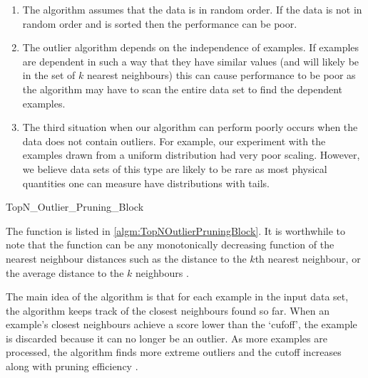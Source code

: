 \begin{enumerate}
    \item The algorithm assumes that the data is in random order. If the data is
        not in random order and is sorted then the performance can be poor.
    \item The outlier algorithm depends on the independence of examples. If
        examples are dependent in such a way that they have similar values (and
        will likely be in the set of $k$ nearest neighbours) this can cause
        performance to be poor as the algorithm may have to scan the entire data
        set to find the dependent examples.
    \item The third situation when our algorithm can perform poorly occurs when
        the data does not contain outliers. For example, our experiment with the
        examples drawn from a uniform distribution had very poor scaling.
        However, we believe data sets of this type are likely to be rare as most
        physical quantities one can measure have distributions with tails.
\end{enumerate}

\begin{algorithm}
    
    \caption{TopN\_Outlier\_Pruning\_Block}
    \label{algm:TopNOutlierPruningBlock}
\end{algorithm}

The  function is listed in
\autoref{algm:TopNOutlierPruningBlock}. It is worthwhile to note that the
 function can be any monotonically decreasing function of the
nearest neighbour distances such as the distance to the $k$th nearest neighbour,
or the average distance to the $k$ neighbours \cite{Bay:2003}.

The main idea of the  algorithm is that for
each example in the input data set, the algorithm keeps track of the closest
neighbours found so far. When an example's closest neighbours achieve a score
lower than the `cufoff', the example is discarded because it can no longer be an
outlier. As more examples are processed, the algorithm finds more extreme
outliers and the cutoff increases along with pruning efficiency \cite{Bay:2003}.

